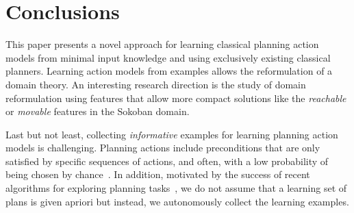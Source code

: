 \documentclass[letterpaper]{article} %
\begin{document}
\section{Conclusions}
This paper presents a novel approach for learning classical planning action models from minimal input knowledge and using exclusively existing classical planners. Learning action models from examples allows the reformulation of a domain theory. An interesting research direction is the study of domain reformulation using features that allow more compact solutions like the {\em reachable} or {\em movable} features in the Sokoban domain.

Last but not least, collecting {\em informative} examples for learning planning action models is challenging. Planning actions include preconditions that are only satisfied by specific sequences of actions, and often, with a low probability of being chosen by chance~\cite{fern2004learning}. In addition, motivated by the success of recent algorithms for exploring planning tasks~\cite{geffner:pwithsimulators:IJCAI17}, we do not assume that a learning set of plans is given apriori but instead, we autonomously collect the learning examples.




\end{document}
